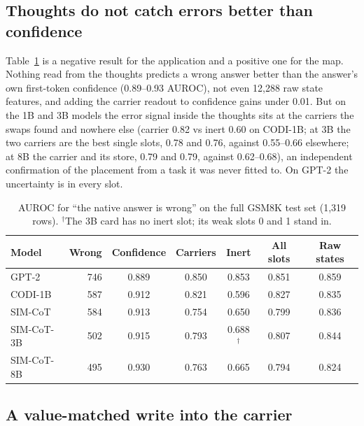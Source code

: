 \documentclass{article}
\begin{document}
\subsection{Thoughts do not catch errors better than confidence}\label{sec:errdet}

Table~\ref{tab:errdet} is a negative result for the application and a positive one for the map. Nothing read from the thoughts predicts a wrong answer better than the answer's own first-token confidence (0.89--0.93 AUROC), not even 12{,}288 raw state features, and adding the carrier readout to confidence gains under 0.01. But on the 1B and 3B models the error signal inside the thoughts sits at the carriers the swaps found and nowhere else (carrier 0.82 vs inert 0.60 on CODI-1B; at 3B the two carriers are the best single slots, 0.78 and 0.76, against 0.55--0.66 elsewhere; at 8B the carrier and its store, 0.79 and 0.79, against 0.62--0.68), an independent confirmation of the placement from a task it was never fitted to. On GPT-2 the uncertainty is in every slot.

\begin{table}[h]
\caption{AUROC for ``the native answer is wrong'' on the full GSM8K test set (1{,}319 rows). $^\dagger$The 3B card has no inert slot; its weak slots 0 and 1 stand in.}
\label{tab:errdet}
\centering
\small
\begin{tabular}{lrccccc}
\toprule
Model & Wrong & Confidence & Carriers & Inert & All slots & Raw states \\
\midrule
GPT-2 & 746 & 0.889 & 0.850 & 0.853 & 0.851 & 0.859 \\
CODI-1B & 587 & 0.912 & 0.821 & 0.596 & 0.827 & 0.835 \\
SIM-CoT & 584 & 0.913 & 0.754 & 0.650 & 0.799 & 0.836 \\
SIM-CoT-3B & 502 & 0.915 & 0.793 & 0.688$^\dagger$ & 0.807 & 0.844 \\
SIM-CoT-8B & 495 & 0.930 & 0.763 & 0.665 & 0.794 & 0.824 \\
\bottomrule
\end{tabular}
\end{table}

\subsection{A value-matched write into the carrier}\label{sec:repair}
\end{document}
